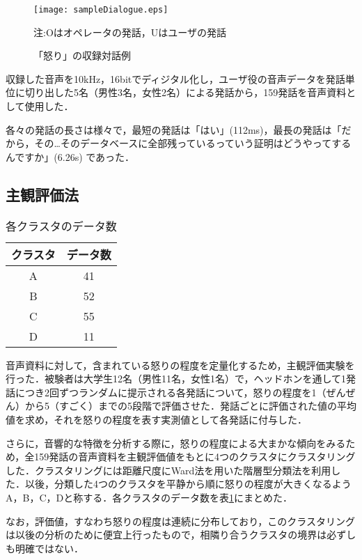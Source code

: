 \documentclass[japanese]{jnlp_1.3c}
\begin{document}
\begin{figure}[t]
\begin{center}
    \texttt{[image: sampleDialogue.eps]}
\caption{「怒り」の収録対話例}
\par 注:Oはオペレータの発話，Uはユーザの発話
\label{fig:utter}
\end{center} 
\end{figure} 

収録した音声を10kHz，16bitでディジタル化し，ユーザ役の音声データを発話単位に切り出した5名（男性3名，女性2名）による発話から，159発話を音声資料として使用した．

各々の発話の長さは様々で，最短の発話は「はい」(112ms)，最長の発話は「だから，その…そのデータベースに全部残っているっていう証明はどうやってするんですか」(6.26s) であった．

\subsection{主観評価法}

\begin{table}[b] 
\caption{各クラスタのデータ数}
\label{tb:cluster}
\begin{center}
\begin{tabular}{cc}
\hline
クラスタ&データ数 \\ \hline
A&41 \\
B&52 \\
C&55 \\
D&11 \\ \hline
\end{tabular}
\end{center}
\end{table}

音声資料に対して，含まれている怒りの程度を定量化するため，主観評価実験を行った．被験者は大学生12名（男性11名，女性1名）で，ヘッドホンを通して1発話につき2回ずつランダムに提示される各発話について，怒りの程度を1（ぜんぜん）から5（すごく）までの5段階で評価させた．発話ごとに評価された値の平均値を求め，それを怒りの程度を表す実測値として各発話に付与した．

さらに，音響的な特徴を分析する際に，怒りの程度による大まかな傾向をみるため，全159発話の音声資料を主観評価値をもとに4つのクラスタにクラスタリングした．クラスタリングには距離尺度にWard法を用いた階層型分類法を利用した．以後，分類した4つのクラスタを平静から順に怒りの程度が大きくなるようA，B，C，Dと称する．各クラスタのデータ数を表\ref{tb:cluster}にまとめた．

なお，評価値，すなわち怒りの程度は連続に分布しており，このクラスタリングは以後の分析のために便宜上行ったもので，相隣り合うクラスタの境界は必ずしも明確ではない．
\end{document}
